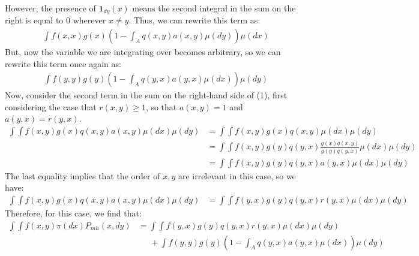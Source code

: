 \documentclass[10pt]{article}
\begin{document}
\noindent
However, the presence of $\mathbf{1}_{dy} \left( x \right)$ means the second integral in the sum on the right is equal to $0$ wherever $x \neq y$. Thus, we can rewrite this term as:
\begin{align*}
    \int f \left( x, x \right) g \left( x \right)  \left( 1 - \int _{A} q \left( x, y \right) a \left( x, y \right) \mu \left( dy \right) \right) \mu \left( dx \right) 
\end{align*}
But, now the variable we are integrating over becomes arbitrary, so we can rewrite this term once again as:
\begin{align*}
    \int f \left( y, y \right) g \left( y \right)  \left( 1 - \int _{A} q \left( y, x \right) a \left( y, x \right) \mu \left( dx \right) \right) \mu \left( dy \right) 
\end{align*}
Now, consider the second term in the sum on the right-hand side of (1), first considering the case that $r \left( x, y \right) \geq 1$, so that $a \left( x, y \right) = 1$ and $a \left( y, x \right) = r \left( y, x \right)$.
\begin{align*}
    \int \int f \left( x, y \right) g \left( x \right) q \left( x, y \right) a \left( x, y \right) \mu \left( dx \right) \mu \left( dy \right) &= \int \int f \left( x, y \right) g \left( x \right) q \left( x, y \right) \mu \left( dx \right) \mu \left( dy \right) \\[1em]
    &= \int \int f \left( x, y \right) g \left( y \right) q \left( y, x \right) \frac{g \left( x \right) q \left( x, y \right)}{g \left( y \right) q \left( y, x \right)} \mu \left( dx \right) \mu \left( dy \right) \\[1em]
    &= \int \int f \left( x, y \right) g \left( y \right) q \left( y, x \right) a \left( y, x \right) \mu \left( dx \right) \mu \left( dy \right)
\end{align*}
The last equality implies that the order of $x, y$ are irrelevant in this case, so we have:
\begin{align*}
    \int \int f \left( x, y \right) g \left( x \right) q \left( x, y \right) a \left( x, y \right) \mu \left( dx \right) \mu \left( dy \right) &= \int \int f \left( y, x \right) g \left( y \right) q \left( y, x \right) r \left( y, x \right) \mu \left( dx \right) \mu \left( dy \right)
\end{align*}
Therefore, for this case, we find that:
\begin{align*}
    \int \int f \left( x, y \right) \pi \left( dx \right) P_{mh} \left( x, dy \right) &= \int \int f \left( y, x \right) g \left( y \right) q \left( y, x \right) r \left( y, x \right) \mu \left( dx \right) \mu \left( dy \right) \\[1em]
    &\; \; \; \; \; + \int f \left( y, y \right) g \left( y \right)  \left( 1 - \int _{A} q \left( y, x \right) a \left( y, x \right) \mu \left( dx \right) \right) \mu \left( dy \right) 
\end{align*}
\end{document}
